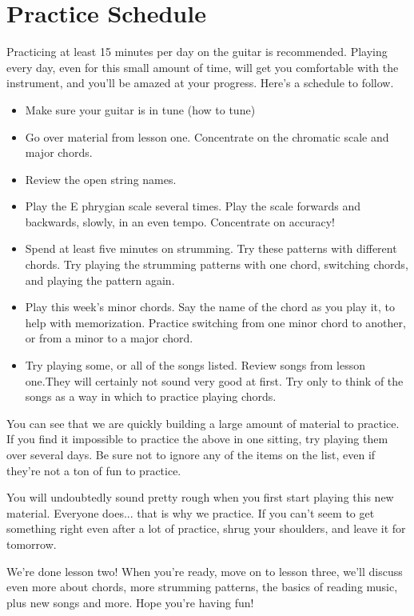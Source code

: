 \section{Practice Schedule}
Practicing at least 15 minutes per day on the guitar is recommended. Playing every day, even for this small amount of time, will get you comfortable with the instrument, and you'll be amazed at your progress. Here's a schedule to follow.
%
\begin{itemize}
\item Make sure your guitar is in tune (how to tune)
\item Go over material from lesson one. Concentrate on the chromatic scale and major chords.
\item Review the open string names.
\item Play the E phrygian scale several times. Play the scale forwards and backwards, slowly, in an even tempo. Concentrate on accuracy!
\item Spend at least five minutes on strumming. Try these patterns with different chords. Try playing the strumming patterns with one chord, switching chords, and playing the pattern again.
\item Play this week's minor chords. Say the name of the chord as you play it, to help with memorization. Practice switching from one minor chord to another, or from a minor to a major chord.
\item Try playing some, or all of the songs listed. Review songs from lesson one.They will certainly not sound very good at first. Try only to think of the songs as a way in which to practice playing chords.
\end{itemize}
%
You can see that we are quickly building a large amount of material to practice. If you find it impossible to practice the above in one sitting, try playing them over several days. Be sure not to ignore any of the items on the list, even if they're not a ton of fun to practice.

You will undoubtedly sound pretty rough when you first start playing this new material. Everyone does... that is why we practice. If you can't seem to get something right even after a lot of practice, shrug your shoulders, and leave it for tomorrow.

We're done lesson two! When you're ready, move on to lesson three, we'll discuss even more about chords, more strumming patterns, the basics of reading music, plus new songs and more. Hope you're having fun!


